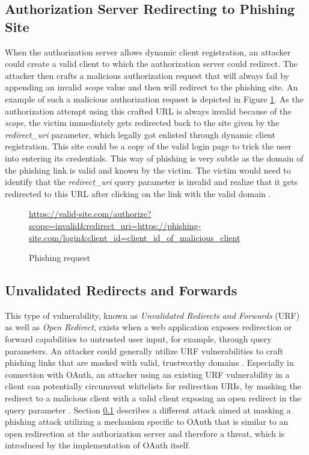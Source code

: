 \documentclass[
    fontsize=12pt,
    headings=small,
    parskip=half,           %
    bibliography=totoc,
    numbers=noenddot,       %
    open=any,               %
    ]{scrreprt}
\begin{document}
\subsection{Authorization Server Redirecting to Phishing Site}
\label{sub:authorization_server_redirecting_to_phishing_site}
When the authorization server allows dynamic client registration, an attacker could create a valid client to which the authorization server could redirect. The attacker then crafts a malicious authorization request that will always fail by appending an invalid \emph{scope} value and then will redirect to the phishing site. An example of such a malicious authorization request is depicted in Figure \ref{fig:phishing_requests}. As the authorization attempt using this crafted URL is always invalid because of the \emph{scope}, the victim immediately gets redirected back to the site given by the \emph{redirect\_uri} parameter, which legally got enlisted through dynamic client registration. This site could be a copy of the valid login page to trick the user into entering its credentials. This way of phishing is very subtle as the domain of the phishing link is valid and known by the victim. The victim would need to identify that the \emph{redirect\_uri} query parameter is invalid and realize that it gets redirected to this URL after clicking on the link with the valid domain \cite{lodderstedt2020oauth}.


\begin{figure}[ht]
	\sffamily\footnotesize
	\url{https://valid-site.com/authorize?scope=invalid&redirect_uri=https://phishing-site.com/login&client_id=client_id_of_malicious_client}
	\linethickness{0.4pt}
	\caption{Phishing request}
	\label{fig:phishing_requests}
\end{figure}

\subsection{Unvalidated Redirects and Forwards}
\label{subsec:open_redirect}
This type of vulnerability, known as \emph{Unvalidated Redirects and Forwards} (URF) as well as \emph{Open Redirect}, exists when a web application exposes redirection or forward capabilities to untrusted user input, for example, through query parameters. An attacker could generally utilize URF vulnerabilities to craft phishing links that are masked with valid, trustworthy domains \cite{wang2015urfds}. Especially in connection with OAuth, an attacker using an existing URF vulnerability in a client can potentially circumvent whitelists for redirection URIs, by masking the redirect to a malicious client with a valid client exposing an open redirect in the query parameter \cite{lodderstedt2020oauth}. Section \ref{sub:authorization_server_redirecting_to_phishing_site} describes a different attack aimed at masking a phishing attack utilizing a mechanism specific to OAuth that is similar to an open redirection at the authorization server and therefore a threat, which is introduced by the implementation of OAuth itself.
\end{document}
